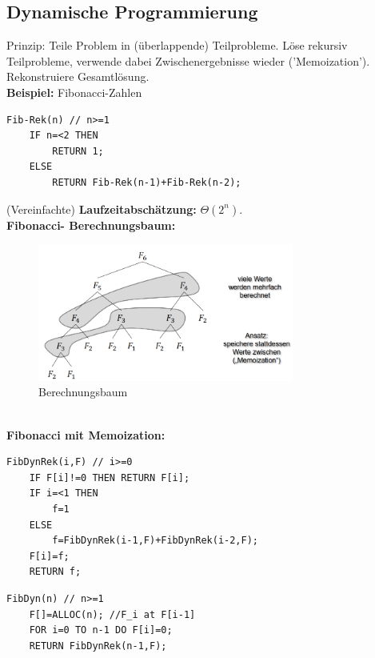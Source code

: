 \documentclass{article}
\begin{document}
        \subsection{Dynamische Programmierung}
            Prinzip: Teile Problem in (überlappende) Teilprobleme. Löse rekursiv Teilprobleme, verwende dabei Zwischenergebnisse wieder ('Memoization'). Rekonstruiere Gesamtlösung.\\
            \textbf{Beispiel:} Fibonacci-Zahlen\\
            \begin{lstlisting}[style=pseudocode]
Fib-Rek(n) // n>=1
    IF n=<2 THEN
        RETURN 1;
    ELSE
        RETURN Fib-Rek(n-1)+Fib-Rek(n-2);
            \end{lstlisting}
            (Vereinfachte) \textbf{Laufzeitabschätzung:} $\Theta (2^n)$.\\
            \textbf{Fibonacci- Berechnungsbaum:}
            \begin{figure}[ht]
                \centering
                \includegraphics[width=0.75\textwidth]{Bilder/FibBaum.png}
                \caption{Berechnungsbaum}
                \label{fig:FibBaum}
            \end{figure}\\
            \textbf{Fibonacci mit Memoization:}
            \begin{lstlisting}[style=pseudocode]
FibDynRek(i,F) // i>=0
    IF F[i]!=0 THEN RETURN F[i];
    IF i=<1 THEN
        f=1
    ELSE
        f=FibDynRek(i-1,F)+FibDynRek(i-2,F);
    F[i]=f;
    RETURN f;
            \end{lstlisting}
            \begin{lstlisting}[style=pseudocode]
FibDyn(n) // n>=1
    F[]=ALLOC(n); //F_i at F[i-1]
    FOR i=0 TO n-1 DO F[i]=0;
    RETURN FibDynRek(n-1,F);
            \end{lstlisting}
\end{document}
